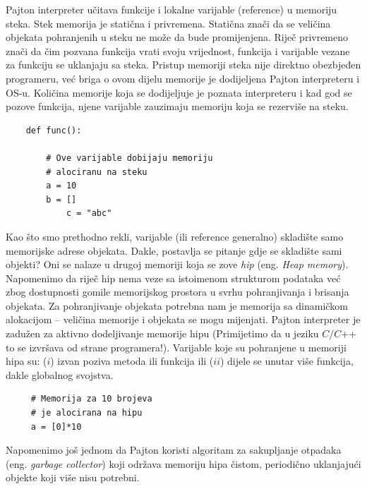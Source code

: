 Pajton interpreter učitava funkcije i lokalne varijable (reference) u memoriju steka. 
Stek memorija je statična i privremena. Statična znači da se veličina objekata pohranjenih u steku ne može da bude promijenjena. Riječ privremeno znači da čim pozvana funkcija vrati svoju vrijednost, funkcija i   varijable vezane za funkciju se uklanjaju sa steka. Pristup memoriji steka nije direktno obezbjeđen programeru, već  briga o ovom dijelu memorije je dodijeljena Pajton interpreteru i OS-u.  Količina memorije koja  se dodijeljuje je poznata interpreteru i kad god se pozove funkcija, njene varijable zauzimaju memoriju koja se rezerviše na steku.

\begin{verbatim}
	def func():
	
	    # Ove varijable dobijaju memoriju 
	    # alociranu na steku 
	    a = 10
	    b = []
            c = "abc"
\end{verbatim}

Kao što smo prethodno rekli, varijable (ili reference generalno) skladište samo memorijske adrese objekata. Dakle, postavlja se pitanje gdje se skladište sami objekti? Oni se nalaze u drugoj memoriji koja se zove \textit{hip} (eng. \textit{Heap memory}). Napomenimo da riječ hip nema veze sa istoimenom strukturom podataka  već  zbog dostupnosti gomile memorijskog prostora u svrhu pohranjivanja i brisanja objekata.   Za pohranjivanje objekata potrebna nam je memorija sa dinamičkom alokacijom  -- veličina memorije i objekata se mogu mijenjati. Pajton interpreter je zadužen za aktivno dodeljivanje memorije hipu (Primijetimo da u jeziku $C/C$++ to  se izvršava od strane programera!). Varijable koje su pohranjene u memoriji hipa su: ($i$)   izvan poziva metoda ili funkcija ili ($ii$) dijele se unutar više funkcija, dakle globalnog svojstva.

\begin{verbatim}
     # Memorija za 10 brojeva
     # je alocirana na hipu
     a = [0]*10     
\end{verbatim}


Napomenimo još jednom da Pajton koristi algoritam za sakupljanje otpadaka (eng. \textit{garbage collector}) koji održava memoriju hipa čistom, periodično uklanjajući  objekte koji više nisu potrebni.





